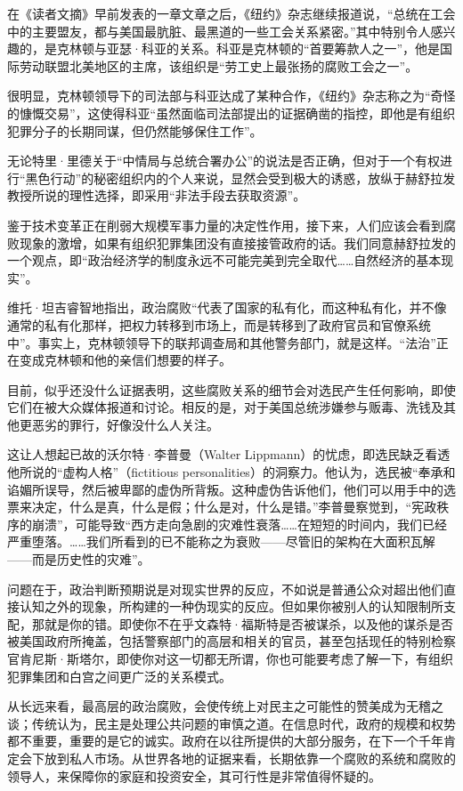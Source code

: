在《读者文摘》早前发表的一章文章之后，《纽约》杂志继续报道说，“总统在工会中的主要盟友，都与美国最肮脏、最黑道的一些工会关系紧密。”其中特别令人感兴趣的，是克林顿与亚瑟·科亚的关系。科亚是克林顿的“首要筹款人之一”，他是国际劳动联盟北美地区的主席，该组织是“劳工史上最张扬的腐败工会之一”。

很明显，克林顿领导下的司法部与科亚达成了某种合作，《纽约》杂志称之为“奇怪的慷慨交易”，这使得科亚“虽然面临司法部提出的证据确凿的指控，即他是有组织犯罪分子的长期同谋，但仍然能够保住工作”。

无论特里·里德关于“中情局与总统合署办公”的说法是否正确，但对于一个有权进行“黑色行动”的秘密组织内的个人来说，显然会受到极大的诱惑，放纵于赫舒拉发教授所说的理性选择，即采用“非法手段去获取资源”。

鉴于技术变革正在削弱大规模军事力量的决定性作用，接下来，人们应该会看到腐败现象的激增，如果有组织犯罪集团没有直接接管政府的话。我们同意赫舒拉发的一个观点，即“政治经济学的制度永远不可能完美到完全取代……自然经济的基本现实”。

维托·坦吉睿智地指出，政治腐败“代表了国家的私有化，而这种私有化，并不像通常的私有化那样，把权力转移到市场上，而是转移到了政府官员和官僚系统中”。事实上，克林顿领导下的联邦调查局和其他警务部门，就是这样。“法治”正在变成克林顿和他的亲信们想要的样子。

目前，似乎还没什么证据表明，这些腐败关系的细节会对选民产生任何影响，即使它们在被大众媒体报道和讨论。相反的是，对于美国总统涉嫌参与贩毒、洗钱及其他更恶劣的罪行，好像没什么人关注。

这让人想起已故的沃尔特·李普曼（Walter Lippmann）的忧虑，即选民缺乏看透他所说的“虚构人格”（fictitious personalities）的洞察力。他认为，选民被“奉承和谄媚所误导，然后被卑鄙的虚伪所背叛。这种虚伪告诉他们，他们可以用手中的选票来决定，什么是真，什么是假；什么是对，什么是错。”李普曼察觉到，“宪政秩序的崩溃”，可能导致“西方走向急剧的灾难性衰落……在短短的时间内，我们已经严重堕落。……我们所看到的已不能称之为衰败——尽管旧的架构在大面积瓦解——而是历史性的灾难”。

问题在于，政治判断预期说是对现实世界的反应，不如说是普通公众对超出他们直接认知之外的现象，所构建的一种伪现实的反应。但如果你被别人的认知限制所支配，那就是你的错。即使你不在乎文森特·福斯特是否被谋杀，以及他的谋杀是否被美国政府所掩盖，包括警察部门的高层和相关的官员，甚至包括现任的特别检察官肯尼斯·斯塔尔，即使你对这一切都无所谓，你也可能要考虑了解一下，有组织犯罪集团和白宫之间更广泛的关系模式。

从长远来看，最高层的政治腐败，会使传统上对民主之可能性的赞美成为无稽之谈；传统认为，民主是处理公共问题的审慎之道。在信息时代，政府的规模和权势都不重要，重要的是它的诚实。政府在以往所提供的大部分服务，在下一个千年肯定会下放到私人市场。从世界各地的证据来看，长期依靠一个腐败的系统和腐败的领导人，来保障你的家庭和投资安全，其可行性是非常值得怀疑的。

